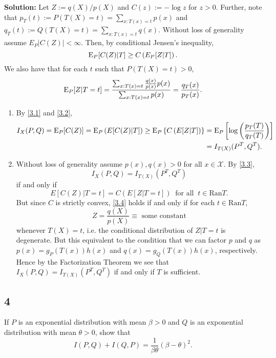 \documentclass[12pt]{article}
\begin{document}
\textbf{Solution:} Let $Z := q(X) / p(X)$ and $C(z) := -\log z$ for $z > 0$. Further, note that $p_T(t) := P(T(X)=t) = \sum_{x : T(x)=t} p(x)$ and 
$q_T(t) := Q(T(X)=t) = \sum_{x : T(x)=t} q(x)$.
Without loss of generality assume $E_{P}|C(Z)| < \infty$. Then, by
conditional Jensen's inequality,
\begin{equation}
  \mathrm{E}_P[C(Z)|T] \geq C\left( E_P[Z|T] \right).
  \label{3.1}
\end{equation}
We also have that for each $t$ such that $P(T(X) = t) > 0$,
\begin{equation}
  \mathrm{E}_P[Z|T=t] = \frac{\sum_{x:T(x) = t}\frac{q(x)}{p(x)}p(x) }{\sum_{x:T(x) = t}p(x)} = \frac{q_{T}(x)}{p_T(x)}.
  \label{3.2}
\end{equation}
\begin{enumerate}
  \item By \eqref{3.1} and \eqref{3.2},
    \begin{align}
      I_{X}(P,Q) = \mathrm{E}_P[C(Z)] = \mathrm{E}_{P}\left( E[C(Z)|T] \right) \geq \mathrm{E}_P\left\{ C\left( E[Z|T] \right) \right\} & = \mathrm{E}_P\left[
      \log\left(\frac{p_T(T)}{q_T(T)}\right) \right] \nonumber \\
      & = I_{T(X)}(P^{T},Q^{T}).
      \label{3.3}
    \end{align}

  \item Without loss of generality assume $p(x), q(x) > 0$ for all $x \in \mathcal{X}$.
    By \eqref{3.3}, 
    \[
      I_X(P,Q) = I_{T(X)}(P^T, Q^T)
    \]
    if and only if 
    \begin{equation}
      E[C(Z)|T=t] = C\left( E[Z|T=t] \right)\  \text{ for all }\ t \in \mathrm{Ran} T.
      \label{3.4}
    \end{equation}
    But since $C$ is strictly convex, \eqref{3.4} holds if and only if for each $t \in \mathrm{Ran} T$, 
    \[
      Z = \frac{q(X)}{p(X)} \equiv \text{ some constant} 
    \]
    whenever $T(X) = t$, i.e. the conditional distribution of $Z | T = t$ is
    degenerate. But this equivalent to the condition that we can factor $p$ and $q$ as $p(x) = g_P(T(x))h(x)$ and $q(x) = g_Q(T(x))h(x)$, respectively.
    Hence by the Factorization Theorem we see that $I_X(P,Q) = I_{T(X)}(P^{T}, Q^{T})$ if and only if $T$ is sufficient.

\end{enumerate}



\newpage
\subsection*{4}
\begin{tcolorbox}
  If $P$ is an exponential distribution with mean $\beta>0$ and $Q$ is an exponential distribution with mean $\theta>0$, show that
  \[
    I(P,Q)+I(Q,P) = \frac{1}{\beta \theta} (\beta-\theta)^2.
  \]
\end{tcolorbox}
\end{document}
